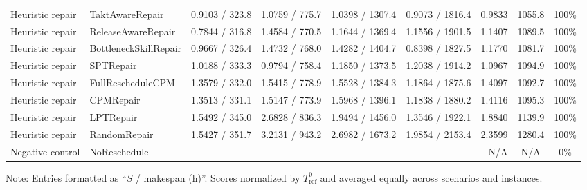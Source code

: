 \documentclass[journal,10pt]{IEEEtran}
\begin{document}
\begin{table}[!t]
\begin{adjustbox}{max width=\textwidth}
\begin{tabular}{@{}llrrrrrcc@{}}
Heuristic repair & TaktAwareRepair & 0.9103 / 323.8 & 1.0759 / 775.7 & 1.0398 / 1307.4 & 0.9073 / 1816.4 & 0.9833 & 1055.8 & 100\% \\
Heuristic repair & ReleaseAwareRepair & 0.7844 / 316.8 & 1.4584 / 770.5 & 1.1644 / 1369.4 & 1.1556 / 1901.5 & 1.1407 & 1089.5 & 100\% \\
Heuristic repair & BottleneckSkillRepair & 0.9667 / 326.4 & 1.4732 / 768.0 & 1.4282 / 1404.7 & 0.8398 / 1827.5 & 1.1770 & 1081.7 & 100\% \\
Heuristic repair & SPTRepair & 1.0188 / 333.3 & 0.9794 / 758.4 & 1.1850 / 1373.5 & 1.2038 / 1914.2 & 1.0967 & 1094.9 & 100\% \\
Heuristic repair & FullRescheduleCPM & 1.3579 / 332.0 & 1.5415 / 778.9 & 1.5528 / 1384.3 & 1.1864 / 1875.6 & 1.4097 & 1092.7 & 100\% \\
Heuristic repair & CPMRepair & 1.3513 / 331.1 & 1.5147 / 773.9 & 1.5968 / 1396.1 & 1.1838 / 1880.2 & 1.4116 & 1095.3 & 100\% \\
Heuristic repair & LPTRepair & 1.5492 / 345.0 & 2.6828 / 836.3 & 1.9494 / 1456.0 & 1.3546 / 1922.1 & 1.8840 & 1139.9 & 100\% \\
Heuristic repair & RandomRepair & 1.5427 / 351.7 & 3.2131 / 943.2 & 2.6982 / 1673.2 & 1.9854 / 2153.4 & 2.3599 & 1280.4 & 100\% \\
Negative control & NoReschedule & --- & --- & --- & --- & N/A & N/A & \phantom{00}0\% \\
\bottomrule
\end{tabular}
\end{adjustbox}
\par\smallskip
{\footnotesize Note: Entries formatted as ``$S$ / makespan (h)''. Scores normalized by $T_{\mathrm{ref}}^0$ and averaged equally across scenarios and instances.}
\end{table}
\end{document}
